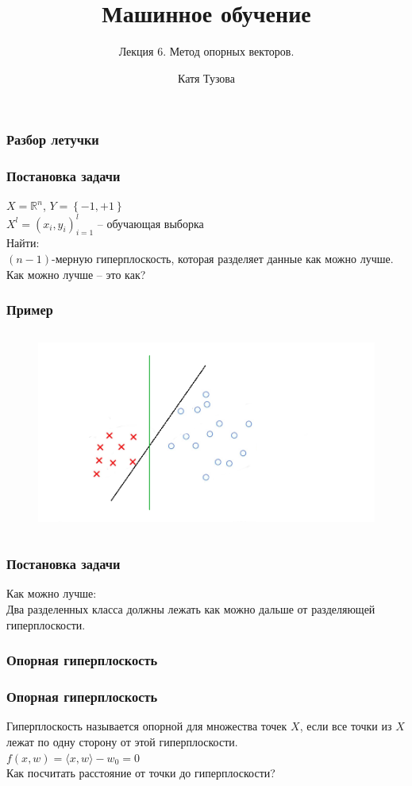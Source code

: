 \documentclass[12pt]{beamer}
\author{Катя Тузова}
\title{Машинное обучение}
\subtitle{Лекция 6. Метод опорных векторов.}
\date{}
\begin{document}
	
\frame{\titlepage}

\begin{frame}\frametitle{Разбор летучки}
\end{frame}

\begin{frame}\frametitle{Постановка задачи}
$X = \mathbb{R}^n$, ${Y = \left\{ -1, + 1\right\}}$\\
${X^l = (x_i, y_i)_{i = 1}^l}$ -- обучающая выборка\\
\vspace{5mm}Найти:\\
$(n-1)$-мерную гиперплоскость, которая разделяет данные как можно лучше.
\\ \vspace{5mm}
Как можно лучше -- это как?

\end{frame}

\begin{frame}\frametitle{Пример}
\begin{figure}[htbp]
  \includegraphics[height=190pt, keepaspectratio = true]{images/example}   
\end{figure}
\end{frame}

\begin{frame}\frametitle{Постановка задачи}
Как можно лучше:\\
Два разделенных класса должны лежать как можно дальше от разделяющей гиперплоскости.\\
\end{frame}

\begin{frame}\frametitle{Опорная гиперплоскость}
\end{frame}

\begin{frame}\frametitle{Опорная гиперплоскость}
Гиперплоскость называется опорной для множества точек
$X$, если все точки из $X$ лежат по одну сторону от этой гиперплоскости.\\\vspace{5mm}
${f(x,w) = \langle x, w\rangle - w_0 = 0}$\\
\vspace{5mm}
Как посчитать расстояние от точки до гиперплоскости?
\end{frame}
\end{document}
